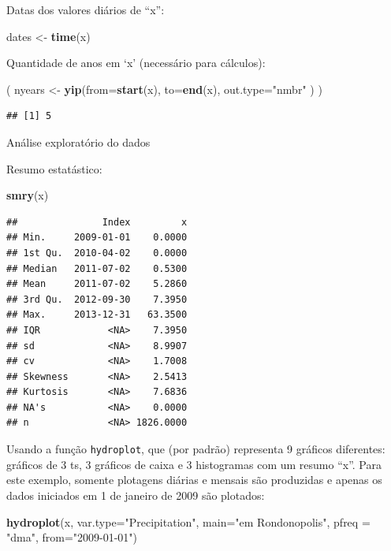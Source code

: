 \documentclass[
]{book}
\newenvironment{Shaded}{\begin{snugshade}}{\end{snugshade}}
\newcommand{\DataTypeTok}[1]{\textcolor[rgb]{0.13,0.29,0.53}{#1}}
\newcommand{\KeywordTok}[1]{\textcolor[rgb]{0.13,0.29,0.53}{\textbf{#1}}}
\newcommand{\NormalTok}[1]{#1}
\newcommand{\StringTok}[1]{\textcolor[rgb]{0.31,0.60,0.02}{#1}}
\begin{document}
Datas dos valores diários de ``x'':

\begin{Shaded}
\begin{Highlighting}[]
\NormalTok{dates <-}\StringTok{ }\KeywordTok{time}\NormalTok{(x)}
\end{Highlighting}
\end{Shaded}

Quantidade de anos em `x' (necessário para cálculos):

\begin{Shaded}
\begin{Highlighting}[]
\NormalTok{( nyears <-}\StringTok{ }\KeywordTok{yip}\NormalTok{(}\DataTypeTok{from=}\KeywordTok{start}\NormalTok{(x), }\DataTypeTok{to=}\KeywordTok{end}\NormalTok{(x), }\DataTypeTok{out.type=}\StringTok{"nmbr"}\NormalTok{ ) )}
\end{Highlighting}
\end{Shaded}

\begin{verbatim}
## [1] 5
\end{verbatim}

Análise exploratório do dados

Resumo estatástico:

\begin{Shaded}
\begin{Highlighting}[]
\KeywordTok{smry}\NormalTok{(x)}
\end{Highlighting}
\end{Shaded}

\begin{verbatim}
##               Index         x
## Min.     2009-01-01    0.0000
## 1st Qu.  2010-04-02    0.0000
## Median   2011-07-02    0.5300
## Mean     2011-07-02    5.2860
## 3rd Qu.  2012-09-30    7.3950
## Max.     2013-12-31   63.3500
## IQR            <NA>    7.3950
## sd             <NA>    8.9907
## cv             <NA>    1.7008
## Skewness       <NA>    2.5413
## Kurtosis       <NA>    7.6836
## NA's           <NA>    0.0000
## n              <NA> 1826.0000
\end{verbatim}

Usando a função \texttt{hydroplot}, que (por padrão) representa 9 gráficos diferentes: gráficos de 3 ts, 3 gráficos de caixa e 3 histogramas com um resumo ``x''. Para este exemplo, somente plotagens diárias e mensais são produzidas e apenas os dados iniciados em 1 de janeiro de 2009 são plotados:

\begin{Shaded}
\begin{Highlighting}[]
\KeywordTok{hydroplot}\NormalTok{(x, }\DataTypeTok{var.type=}\StringTok{"Precipitation"}\NormalTok{, }\DataTypeTok{main=}\StringTok{"em Rondonopolis"}\NormalTok{,}
          \DataTypeTok{pfreq =} \StringTok{"dma"}\NormalTok{, }\DataTypeTok{from=}\StringTok{"2009-01-01"}\NormalTok{)}
\end{Highlighting}
\end{Shaded}
\end{document}
